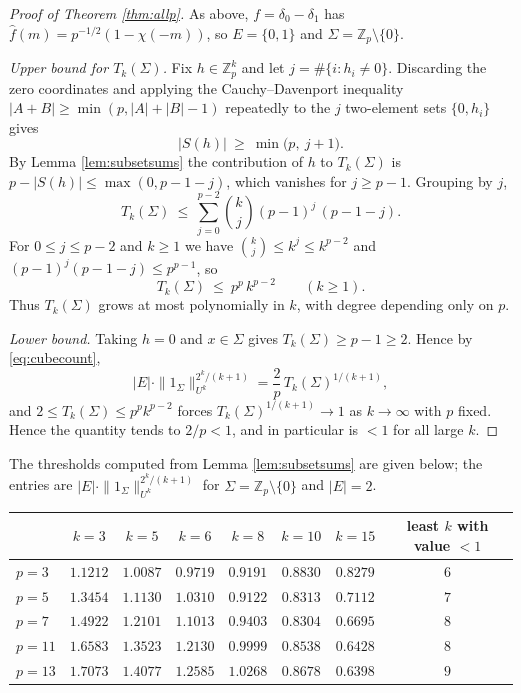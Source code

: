 \documentclass[12pt]{amsart}
\newcommand{\Z}{\mathbb{Z}}
\begin{document}
\begin{proof}[Proof of Theorem \ref{thm:allp}]
As above, $f=\delta_0-\delta_1$ has $\hat f(m)=p^{-1/2}(1-\chi(-m))$, so $E=\{0,1\}$ and $\Sigma=\Z_p\setminus\{0\}$.

\emph{Upper bound for $T_k(\Sigma)$.} Fix $h\in\Z_p^k$ and let $j=\#\{i:h_i\ne0\}$. Discarding the zero coordinates and applying the Cauchy--Davenport inequality $|A+B|\ge\min(p,|A|+|B|-1)$ repeatedly to the $j$ two-element sets $\{0,h_i\}$ gives
\[
|S(h)|\ \ge\ \min\bigl(p,\ j+1\bigr).
\]
By Lemma \ref{lem:subsetsums} the contribution of $h$ to $T_k(\Sigma)$ is $p-|S(h)|\le\max(0,p-1-j)$, which vanishes for $j\ge p-1$. Grouping by $j$,
\[
T_k(\Sigma)\ \le\ \sum_{j=0}^{p-2}\binom kj (p-1)^j\,(p-1-j).
\]
For $0\le j\le p-2$ and $k\ge1$ we have $\binom kj\le k^{j}\le k^{p-2}$ and $(p-1)^j(p-1-j)\le p^{p-1}$, so
\begin{equation}\label{eq:polybound}
T_k(\Sigma)\ \le\ p^{p}\,k^{p-2}
\qquad (k\ge1).
\end{equation}
Thus $T_k(\Sigma)$ grows at most polynomially in $k$, with degree depending only on $p$.

\emph{Lower bound.} Taking $h=0$ and $x\in\Sigma$ gives $T_k(\Sigma)\ge p-1\ge2$. Hence by \eqref{eq:cubecount},
\[
|E|\cdot\|1_\Sigma\|_{U^k}^{2^k/(k+1)}=\frac{2}{p}\,T_k(\Sigma)^{1/(k+1)},
\]
and $2\le T_k(\Sigma)\le p^pk^{p-2}$ forces $T_k(\Sigma)^{1/(k+1)}\to1$ as $k\to\infty$ with $p$ fixed. Hence the quantity tends to $2/p<1$, and in particular is $<1$ for all large $k$.
\end{proof}

The thresholds computed from Lemma \ref{lem:subsetsums} are given below; the entries are $|E|\cdot\|1_\Sigma\|_{U^k}^{2^k/(k+1)}$ for $\Sigma=\Z_p\setminus\{0\}$ and $|E|=2$.

\begin{center}
\begin{tabular}{lcccccc c}
\toprule
 & $k=3$ & $k=5$ & $k=6$ & $k=8$ & $k=10$ & $k=15$ & least $k$ with value $<1$\\
\midrule
$p=3$  & $1.1212$ & $1.0087$ & $0.9719$ & $0.9191$ & $0.8830$ & $0.8279$ & $6$\\
$p=5$  & $1.3454$ & $1.1130$ & $1.0310$ & $0.9122$ & $0.8313$ & $0.7112$ & $7$\\
$p=7$  & $1.4922$ & $1.2101$ & $1.1013$ & $0.9403$ & $0.8304$ & $0.6695$ & $8$\\
$p=11$ & $1.6583$ & $1.3523$ & $1.2130$ & $0.9999$ & $0.8538$ & $0.6428$ & $8$\\
$p=13$ & $1.7073$ & $1.4077$ & $1.2585$ & $1.0268$ & $0.8678$ & $0.6398$ & $9$\\
\bottomrule
\end{tabular}
\end{center}
\end{document}
